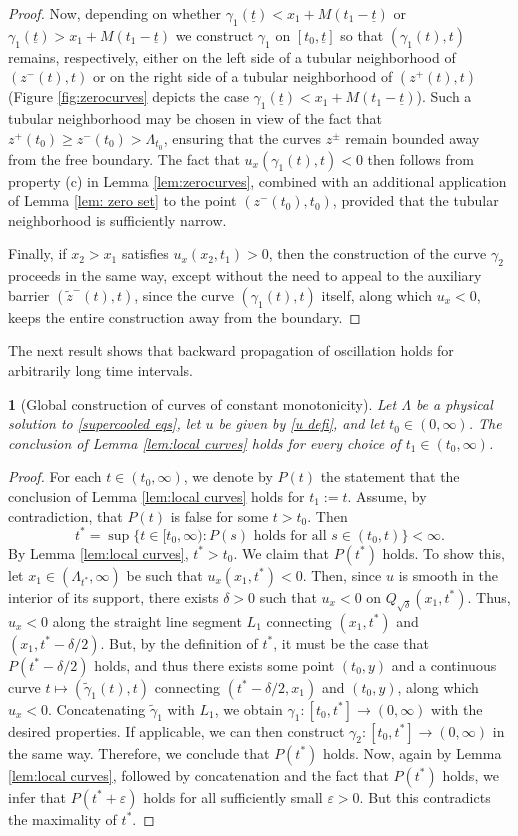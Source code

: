 \documentclass{article}
\numberwithin{equation}{section}
\numberwithin{figure}{section}
\theoremstyle{plain}
\theoremstyle{plain}
\theoremstyle{plain}
\theoremstyle{plain}
\newtheorem{lem}[thm]{\protect\lemmaname}
\theoremstyle{definition}
\theoremstyle{remark}
\def\vep{\varepsilon}
\def\be{\begin{equation}}
\def\ee{\end{equation}}
\def\ut{{\underline{t}}}
\providecommand{\lemmaname}{Lemma}
\begin{document}
\begin{proof}
Now, depending on whether $\gamma_1(\ut)<x_1+M(t_1-\underline{t})$ or $\gamma_1(\ut)>x_1+M(t_1-\underline{t})$ we construct $\gamma_1$ on $[t_0,\ut]$ so that $(\gamma_1(t),t)$ remains, respectively, either on the left side of a tubular neighborhood of $(z^-(t),t)$ or on the right side of a tubular neighborhood of $(z^+(t),t)$ (Figure \ref{fig:zerocurves} depicts the case $\gamma_1(\underline{t})<x_1+M(t_1-\underline{t})$). Such a tubular neighborhood may be chosen in view of the fact that $z^+(t_0)\geq z^-(t_0)>\Lambda_{t_0}$, ensuring that the curves $z^{\pm}$ remain bounded away from the free boundary. The fact that $u_x(\gamma_1(t),t)<0$ then follows from property (c) in Lemma \ref{lem:zerocurves}, combined with an additional application of Lemma \ref{lem: zero set} to the point $(z^-(t_0),t_0)$, provided that the tubular neighborhood is sufficiently narrow.

Finally, if $x_2>x_1$ satisfies $u_x(x_2,t_1)>0$, then the construction of the curve $\gamma_2$ proceeds in the same way, except without the need to appeal to the auxiliary barrier $(\tilde{z}^-(t),t)$, since the curve $(\gamma_1(t),t)$ itself, along which $u_x<0$, keeps the entire construction away from the boundary.
\end{proof}
The next result shows that backward propagation of oscillation holds for arbitrarily long time intervals.
\begin{lem}[Global construction of curves of constant monotonicity] \label{lem:global curves} Let $\Lambda$ be a physical solution to \eqref{supercooled eqs}, let $u$ be given by \eqref{u defi}, and let $t_0\in (0,\infty)$. The conclusion of Lemma \ref{lem:local curves} holds for every choice of $t_1 \in (t_0,\infty)$.
\end{lem}
\begin{proof} For each $t\in (t_0,\infty)$, we denote by $P(t)$ the statement that the conclusion of Lemma \ref{lem:local curves} holds for $t_1:=t$. Assume, by contradiction, that $P(t)$ is false for some $t>t_0$. Then
\be t^*=\sup\{t\in [t_0,\infty): P(s)\text{ holds for all } s\in(t_0,t) \}<\infty. \ee 
By Lemma \ref{lem:local curves}, $t^*>t_0$. We claim that $P(t^*)$ holds. To show this, let $x_1 \in (\Lambda_{t^*},\infty)$ be such that $u_x(x_1,t^*)<0$. Then, since $u$ is smooth in the interior of its support, there exists $\delta>0$ such that $u_x<0$ on $Q_{\sqrt\delta}(x_1,t^*)$. Thus, $u_x<0$ along the straight line segment $L_1$ connecting $(x_1,t^*)$ and $(x_1,t^*-\delta/2)$. But, by the definition of $t^*$, it must be the case that $P(t^*-\delta/2)$ holds, and thus there exists some point $(t_0,y)$ and a continuous curve $t \mapsto (\tilde{\gamma}_1(t),t)$ connecting $(t^*-\delta/2,x_1)$ and $(t_0,y)$, along which $u_x<0$. Concatenating $\tilde{\gamma}_1$ with $L_1$, we obtain $\gamma_1:[t_0,t^*] \to (0,\infty)$ with the desired properties. If applicable, we can then construct $\gamma_2:[t_0,t^*]\to (0,\infty)$ in the same way. Therefore, we conclude that $P(t^*)$ holds. Now, again by Lemma \ref{lem:local curves}, followed by concatenation and the fact that $P(t^*)$ holds, we infer that $P(t^*+\vep)$ holds for all sufficiently small $\vep>0$. But this contradicts the maximality of $t^*$.
\end{proof}
\end{document}
